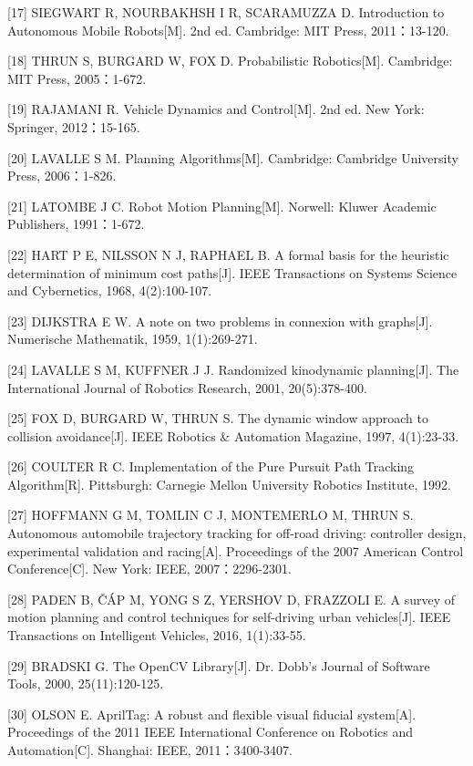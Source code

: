 \documentclass[UTF8,a4paper,12pt]{ctexart}
\begin{document}
{[}17{]} SIEGWART R, NOURBAKHSH I R, SCARAMUZZA D. Introduction to Autonomous Mobile Robots{[}M{]}. 2nd ed. Cambridge: MIT Press, 2011：13-120.

{[}18{]} THRUN S, BURGARD W, FOX D. Probabilistic Robotics{[}M{]}. Cambridge: MIT Press, 2005：1-672.

{[}19{]} RAJAMANI R. Vehicle Dynamics and Control{[}M{]}. 2nd ed. New York: Springer, 2012：15-165.

{[}20{]} LAVALLE S M. Planning Algorithms{[}M{]}. Cambridge: Cambridge University Press, 2006：1-826.

{[}21{]} LATOMBE J C. Robot Motion Planning{[}M{]}. Norwell: Kluwer Academic Publishers, 1991：1-672.

{[}22{]} HART P E, NILSSON N J, RAPHAEL B. A formal basis for the heuristic determination of minimum cost paths{[}J{]}. IEEE Transactions on Systems Science and Cybernetics, 1968, 4(2):100-107.

{[}23{]} DIJKSTRA E W. A note on two problems in connexion with graphs{[}J{]}. Numerische Mathematik, 1959, 1(1):269-271.

{[}24{]} LAVALLE S M, KUFFNER J J. Randomized kinodynamic planning{[}J{]}. The International Journal of Robotics Research, 2001, 20(5):378-400.

{[}25{]} FOX D, BURGARD W, THRUN S. The dynamic window approach to collision avoidance{[}J{]}. IEEE Robotics \& Automation Magazine, 1997, 4(1):23-33.

{[}26{]} COULTER R C. Implementation of the Pure Pursuit Path Tracking Algorithm{[}R{]}. Pittsburgh: Carnegie Mellon University Robotics Institute, 1992.

{[}27{]} HOFFMANN G M, TOMLIN C J, MONTEMERLO M, THRUN S. Autonomous automobile trajectory tracking for off-road driving: controller design, experimental validation and racing{[}A{]}. Proceedings of the 2007 American Control Conference{[}C{]}. New York: IEEE, 2007：2296-2301.

{[}28{]} PADEN B, ČÁP M, YONG S Z, YERSHOV D, FRAZZOLI E. A survey of motion planning and control techniques for self-driving urban vehicles{[}J{]}. IEEE Transactions on Intelligent Vehicles, 2016, 1(1):33-55.

{[}29{]} BRADSKI G. The OpenCV Library{[}J{]}. Dr. Dobb's Journal of Software Tools, 2000, 25(11):120-125.

{[}30{]} OLSON E. AprilTag: A robust and flexible visual fiducial system{[}A{]}. Proceedings of the 2011 IEEE International Conference on Robotics and Automation{[}C{]}. Shanghai: IEEE, 2011：3400-3407.
\end{document}
